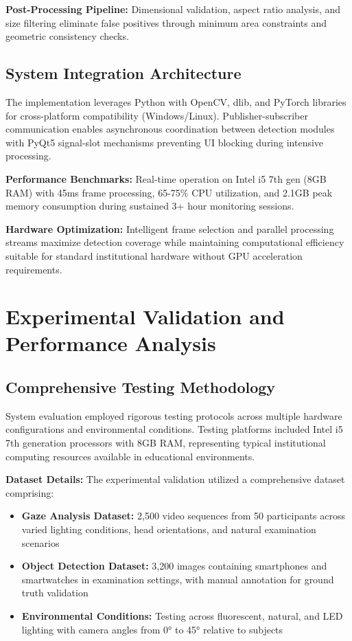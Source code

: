 \documentclass[conference]{IEEEtran}
\begin{document}
\textbf{Post-Processing Pipeline:} Dimensional validation, aspect ratio analysis, and size filtering eliminate false positives through minimum area constraints and geometric consistency checks.

\subsection{System Integration Architecture}

The implementation leverages Python with OpenCV, dlib, and PyTorch libraries for cross-platform compatibility (Windows/Linux). Publisher-subscriber communication enables asynchronous coordination between detection modules with PyQt5 signal-slot mechanisms preventing UI blocking during intensive processing.

\textbf{Performance Benchmarks:} Real-time operation on Intel i5 7th gen (8GB RAM) with 45ms frame processing, 65-75\% CPU utilization, and 2.1GB peak memory consumption during sustained 3+ hour monitoring sessions.

\textbf{Hardware Optimization:} Intelligent frame selection and parallel processing streams maximize detection coverage while maintaining computational efficiency suitable for standard institutional hardware without GPU acceleration requirements.

\section{Experimental Validation and Performance Analysis}

\subsection{Comprehensive Testing Methodology}

System evaluation employed rigorous testing protocols across multiple hardware configurations 
and environmental conditions. Testing platforms included Intel i5 7th generation processors 
with 8GB RAM, representing typical institutional computing resources available in educational 
environments.

\textbf{Dataset Details:} The experimental validation utilized a comprehensive dataset comprising:
\begin{itemize}
    \item \textbf{Gaze Analysis Dataset:} 2,500 video sequences from 50 participants across varied lighting conditions, head orientations, and natural examination scenarios
    \item \textbf{Object Detection Dataset:} 3,200 images containing smartphones and smartwatches in examination settings, with manual annotation for ground truth validation
    \item \textbf{Environmental Conditions:} Testing across fluorescent, natural, and LED lighting with camera angles from 0° to 45° relative to subjects
\end{itemize}
\end{document}
